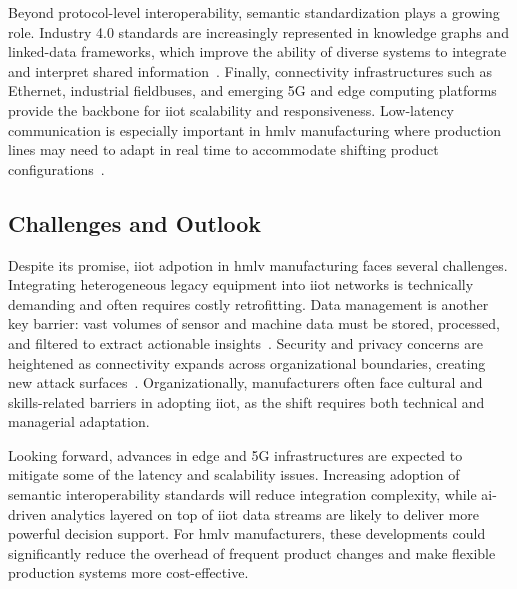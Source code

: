 Beyond protocol-level interoperability, semantic standardization plays a growing role.
Industry 4.0 standards are increasingly represented in knowledge graphs and linked-data frameworks, which improve the ability of diverse systems to integrate and interpret shared information~\cite{grangel-gonzales-analyzing-a-knowledge-graph}.
Finally, connectivity infrastructures such as Ethernet, industrial fieldbuses, and emerging 5G and edge computing platforms provide the backbone for \ac{iiot} scalability and responsiveness.
Low-latency communication is especially important in \ac{hmlv} manufacturing where production lines may need to adapt in real time to accommodate shifting product configurations~\cite{al-fuqaha-internet-of-things-a-survey-on-enabling}.

\subsection{Challenges and Outlook}

Despite its promise, \ac{iiot} adpotion in \ac{hmlv} manufacturing faces several challenges.
Integrating heterogeneous legacy equipment into \ac{iiot} networks is technically demanding and often requires costly retrofitting.
Data management is another key barrier: vast volumes of sensor and machine data must be stored, processed, and filtered to extract actionable insights~\cite{zhong-intelligent-manufacturing-in-the-context}.
Security and privacy concerns are heightened as connectivity expands across organizational boundaries, creating new attack surfaces~\cite{boyes-the-industrial-internet-of-things}.
Organizationally, manufacturers often face cultural and skills-related barriers in adopting \ac{iiot}, as the shift requires both technical and managerial adaptation.

Looking forward, advances in edge and 5G infrastructures are expected to mitigate some of the latency and scalability issues.
Increasing adoption of semantic interoperability standards will reduce integration complexity, while \ac{ai}-driven analytics layered on top of \ac{iiot} data streams are likely to deliver more powerful decision support.
For \ac{hmlv} manufacturers, these developments could significantly reduce the overhead of frequent product changes and make flexible production systems more cost-effective.
